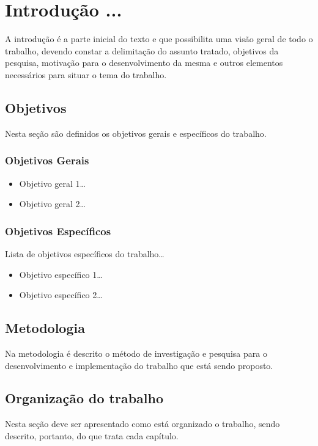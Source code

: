 \chapter{Introdução ...}
\label{chap:introducao}

A introdução é a parte inicial do texto e que possibilita uma visão geral de
todo o trabalho, devendo constar a delimitação do assunto tratado, objetivos da
pesquisa, motivação para o desenvolvimento da mesma e outros elementos
necessários para situar o tema do trabalho.

\section{Objetivos}

Nesta seção são definidos os objetivos gerais e específicos do trabalho.

\subsection{Objetivos Gerais}

\begin{itemize}
  \item Objetivo geral 1\ldots
  \item Objetivo geral 2\ldots  
\end{itemize}

\subsection{Objetivos Específicos} 

Lista de objetivos específicos do trabalho\ldots

\begin{itemize}
  \item Objetivo específico 1\ldots
  \item Objetivo específico 2\ldots  
\end{itemize}

\section{Metodologia}

Na metodologia é descrito o método de investigação e pesquisa para o
desenvolvimento e implementação do trabalho que está sendo proposto.

\section{Organização do trabalho}

Nesta seção deve ser apresentado como está organizado o trabalho, sendo
descrito, portanto, do que trata cada capítulo.
